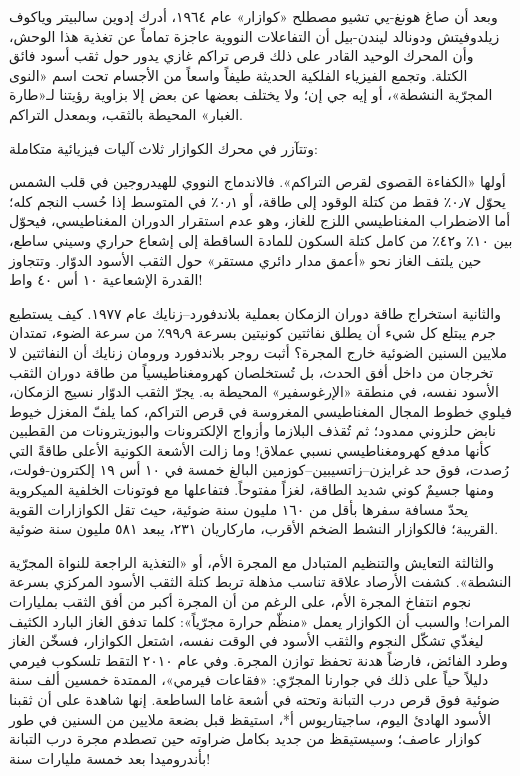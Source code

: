 \documentclass[12pt,a4paper,openany]{book}
\begin{document}
وبعد أن صاغ هونغ-يي تشيو مصطلح «كوازار» عام ١٩٦٤، أدرك إدوين سالبيتر وياكوف زيلدوفيتش ودونالد ليندن-بيل أن التفاعلات النووية عاجزة تماماً عن تغذية هذا الوحش، وأن المحرك الوحيد القادر على ذلك قرص تراكم غازي يدور حول ثقب أسود فائق الكتلة. وتجمع الفيزياء الفلكية الحديثة طيفاً واسعاً من الأجسام تحت اسم «النوى المجرّية النشطة»، أو إيه جي إن؛ ولا يختلف بعضها عن بعض إلا بزاوية رؤيتنا لـ«طارة الغبار» المحيطة بالثقب، وبمعدل التراكم.


وتتآزر في محرك الكوازار ثلاث آليات فيزيائية متكاملة:


أولها «الكفاءة القصوى لقرص التراكم». فالاندماج النووي للهيدروجين في قلب الشمس يحوّل ٠٫٧٪ فقط من كتلة الوقود إلى طاقة، أو ٠٫١٪ في المتوسط إذا حُسب النجم كله؛ أما الاضطراب المغناطيسي اللزج للغاز، وهو عدم استقرار الدوران المغناطيسي، فيحوّل بين ١٠٪ و٤٢٪ من كامل كتلة السكون للمادة الساقطة إلى إشعاع حراري وسيني ساطع، حين يلتف الغاز نحو «أعمق مدار دائري مستقر» حول الثقب الأسود الدوّار. وتتجاوز القدرة الإشعاعية ١٠ أس ٤٠ واط!


والثانية استخراج طاقة دوران الزمكان بعملية بلاندفورد–زنايك عام ١٩٧٧. كيف يستطيع جرم يبتلع كل شيء أن يطلق نفاثتين كونيتين بسرعة ٩٩٫٩٪ من سرعة الضوء، تمتدان ملايين السنين الضوئية خارج المجرة؟ أثبت روجر بلاندفورد ورومان زنايك أن النفاثتين لا تخرجان من داخل أفق الحدث، بل تُستخلصان كهرومغناطيسياً من طاقة دوران الثقب الأسود نفسه، في منطقة «الإرغوسفير» المحيطة به. يجرّ الثقب الدوّار نسيج الزمكان، فيلوي خطوط المجال المغناطيسي المغروسة في قرص التراكم، كما يلفّ المغزل خيوط نابض حلزوني ممدود؛ ثم تُقذف البلازما وأزواج الإلكترونات والبوزيترونات من القطبين كأنها مدفع كهرومغناطيسي نسبي عملاق! وما زالت الأشعة الكونية الأعلى طاقةً التي رُصدت، فوق حد غرايزن–زاتسيبين–كوزمين البالغ خمسة في ١٠ أس ١٩ إلكترون-فولت، ومنها جسيمٌ كوني شديد الطاقة، لغزاً مفتوحاً. فتفاعلها مع فوتونات الخلفية الميكروية يحدّ مسافة سفرها بأقل من ١٦٠ مليون سنة ضوئية، حيث تقل الكوازارات القوية القريبة؛ فالكوازار النشط الضخم الأقرب، ماركاريان ٢٣١، يبعد ٥٨١ مليون سنة ضوئية.


والثالثة التعايش والتنظيم المتبادل مع المجرة الأم، أو «التغذية الراجعة للنواة المجرّية النشطة». كشفت الأرصاد علاقة تناسب مذهلة تربط كتلة الثقب الأسود المركزي بسرعة نجوم انتفاخ المجرة الأم، على الرغم من أن المجرة أكبر من أفق الثقب بمليارات المرات! والسبب أن الكوازار يعمل «منظّم حرارة مجرّياً»: كلما تدفق الغاز البارد الكثيف ليغذّي تشكّل النجوم والثقب الأسود في الوقت نفسه، اشتعل الكوازار، فسخّن الغاز وطرد الفائض، فارضاً هدنة تحفظ توازن المجرة. وفي عام ٢٠١٠ التقط تلسكوب فيرمي دليلاً حياً على ذلك في جوارنا المجرّي: «فقاعات فيرمي»، الممتدة خمسين ألف سنة ضوئية فوق قرص درب التبانة وتحته في أشعة غاما الساطعة. إنها شاهدة على أن ثقبنا الأسود الهادئ اليوم، ساجيتاريوس أ*، استيقظ قبل بضعة ملايين من السنين في طور كوازار عاصف؛ وسيستيقظ من جديد بكامل ضراوته حين تصطدم مجرة درب التبانة بأندروميدا بعد خمسة مليارات سنة!
\end{document}
